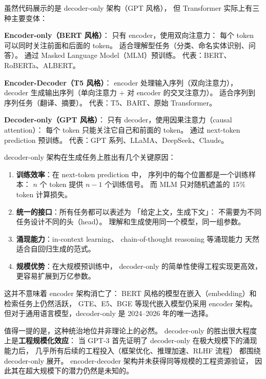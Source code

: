 虽然代码展示的是 decoder-only 架构（GPT 风格），
但 Transformer 实际上有三种主要变体：

\textbf{Encoder-only（BERT 风格）}：
只有 encoder，使用双向注意力：
每个 token 可以同时关注前面和后面的 token。
适合理解型任务（分类、命名实体识别、问答）。
通过 Masked Language Model（MLM）预训练。
代表：BERT、RoBERTa、ALBERT。

\textbf{Encoder-Decoder（T5 风格）}：
encoder 处理输入序列（双向注意力），
decoder 生成输出序列（单向注意力 + 对 encoder 的交叉注意力）。
适合序列到序列任务（翻译、摘要）。
代表：T5、BART、原始 Transformer。

\textbf{Decoder-only（GPT 风格）}：
只有 decoder，使用因果注意力（causal attention）：
每个 token 只能关注它自己和前面的 token。
通过 next-token prediction 预训练。
代表：GPT 系列、LLaMA、DeepSeek、Claude。

\begin{whybox}
decoder-only 架构在生成任务上胜出有几个关键原因：
\begin{enumerate}[noitemsep]
  \item \textbf{训练效率}：在 next-token prediction 中，
        序列中的每个位置都是一个训练样本：
        $n$ 个 token 提供 $n-1$ 个训练信号。
        而 MLM 只对随机遮盖的 15\% token 计算损失。
  \item \textbf{统一的接口}：所有任务都可以表述为
        「给定上文，生成下文」：
        不需要为不同任务设计不同的头（head）。
        理解和生成使用同一个模型，同一组参数。
  \item \textbf{涌现能力}：in-context learning、
        chain-of-thought reasoning 等涌现能力
        天然适合自回归生成的范式。
  \item \textbf{规模优势}：在大规模预训练中，
        decoder-only 的简单性使得工程实现更高效，
        更容易扩展到万亿参数。
\end{enumerate}
这并不意味着 encoder 架构消亡了：
BERT 风格的模型在嵌入（embedding）和检索任务上仍然活跃，
GTE、E5、BGE 等现代嵌入模型仍采用 encoder 架构。
但对于通用语言模型，decoder-only 是 2024--2026 年的唯一选择。

值得一提的是，这种统治地位并非理论上的必然。
decoder-only 的胜出很大程度上是\textbf{工程规模化效应}：
当 GPT-3 首先证明了 decoder-only 在极大规模下的涌现能力后，
几乎所有后续的工程投入（框架优化、推理加速、RLHF 流程）
都围绕 decoder-only 展开。
encoder-decoder 架构并未获得同等规模的工程资源验证，
因此其在超大规模下的潜力仍然是未知的。
\end{whybox}


